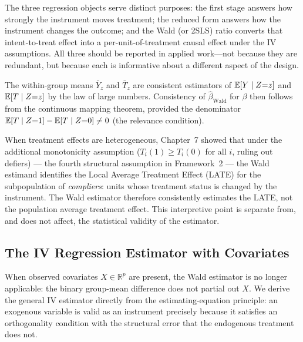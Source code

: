 \documentclass[master.tex]{subfiles}
\begin{document}
The three regression objects serve distinct purposes: the first stage
answers how strongly the instrument moves treatment; the reduced form
answers how the instrument changes the outcome; and the Wald (or 2SLS)
ratio converts that intent-to-treat effect into a per-unit-of-treatment
causal effect under the IV assumptions.  All three should be reported
in applied work---not because they are redundant, but because each is
informative about a different aspect of the design.

\begin{remark}
The within-group means $\bar{Y}_z$ and $\bar{T}_z$ are consistent
estimators of $\mathbb{E}[Y \mid Z{=}z]$ and $\mathbb{E}[T \mid Z{=}z]$ by the law
of large numbers.  Consistency of $\hat\beta_{\mathrm{Wald}}$ for
$\beta$ then follows from the continuous mapping theorem, provided
the denominator $\mathbb{E}[T \mid Z{=}1] - \mathbb{E}[T \mid Z{=}0] \neq 0$
(the relevance condition).
\end{remark}

\begin{remark}
When treatment effects are heterogeneous, Chapter~7 showed that under
the additional monotonicity assumption ($T_i(1) \geq T_i(0)$ for all
$i$, ruling out defiers) --- the fourth structural assumption in
Framework~2 --- the Wald estimand identifies the Local Average
Treatment Effect (LATE) for the subpopulation of \emph{compliers}:
units whose treatment status is changed by the instrument.  The Wald
estimator therefore consistently estimates the LATE, not the population
average treatment effect.  This interpretive point is separate from,
and does not affect, the statistical validity of the estimator.
\end{remark}

\subsection{The IV Regression Estimator with Covariates}

When observed covariates $X \in \mathbb{R}^p$ are present, the Wald
estimator is no longer applicable: the binary group-mean difference
does not partial out $X$.  We derive the general IV estimator
directly from the estimating-equation principle: an exogenous
variable is valid as an instrument precisely because it satisfies an
orthogonality condition with the structural error that the endogenous
treatment does not.
\end{document}
